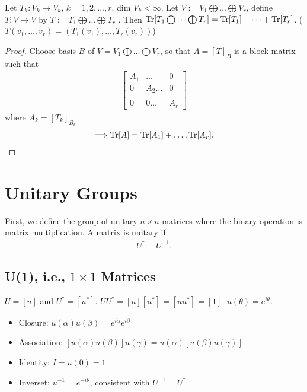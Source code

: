 \documentclass[../../note.tex]{subfiles}
\begin{document}
\begin{proposition}
    Let $T_k: V_k \rightarrow V_k$, $k = 1,2,...,r$, dim $V_k < \infty$. Let $V:= V_1 \bigoplus \dots \bigoplus V_r$, define $T: V \rightarrow V$ by $T:= T_1 \bigoplus\dots\bigoplus T_r$ . Then $\operatorname{Tr}[T_1 \bigoplus \dots \bigoplus T_r] = \operatorname{Tr}[T_1] + \dots + \operatorname{Tr}[T_r]$. ($T(v_1,\dots, v_r) = (T_1(v_1),\dots,T_r(v_r))$)
\end{proposition}
\begin{proof}
    Choose basis $B$ of $V = V_1 \bigoplus \dots \bigoplus V_r$, so that $A = [T]_B$ is a block matrix such that
    \begin{align}
        \left[
        \begin{matrix}
            A_1&\dots   &0 \\
            0  &A_2\dots&0 \\
               &        &  \\
            0  &0\dots  &A_r  
        \end{matrix}
        \right]
    \end{align}
    where $A_k = [T_k]_{B_k}$
    \begin{align}
        \Longrightarrow \operatorname{Tr}[A] = \operatorname{Tr}[A_1] + \dots, \operatorname{Tr}[A_r].
    \end{align}
\end{proof}

\section{Unitary Groups}
First, we define the group of unitary  $n \times n$ matrices where the binary operation is matrix multiplication. A matrix is unitary if 
\begin{align}
    U^\dagger = U^{-1}.
\end{align}

\subsection{U(1), i.e., $1 \times 1$ Matrices}
$U = [u]$ and $U^\dagger = [u^\ast]$. $U U^\dagger = [u] [u^\ast] = [u u^\ast] = [1]$. $u(\theta) = e^{i \theta}$.
\begin{itemize}
    \item Closure: $u(\alpha)u(\beta) = e^{i \alpha} e^{i \beta}$ 
    \item Association: $[u(\alpha) u(\beta)]u(\gamma) = u(\alpha)[u(\beta)u(\gamma)]$ 
    \item Identity: $I = u(0) =1$
    \item Inverset: $u^{-1} = e^{-i \theta}$, consistent with $U^{-1} = U^\dagger$.
\end{itemize}
\end{document}
